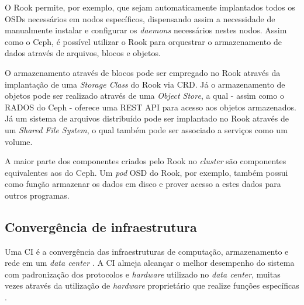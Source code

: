 O Rook permite, por exemplo, que sejam automaticamente implantados todos os \ac{OSD}s necessários em nodos específicos, dispensando assim a necessidade de manualmente instalar e configurar os \textit{daemons} necessários nestes nodos. Assim como o Ceph, é possível utilizar o Rook para orquestrar o armazenamento de dados através de arquivos, blocos e objetos.

O armazenamento através de blocos pode ser empregado no Rook através da implantação de uma \textit{Storage Class} do Rook via \ac{CRD}. Já o armazenamento de objetos pode ser realizado através de uma \textit{Object Store}, a qual - assim como o \ac{RADOS} do Ceph - oferece uma \ac{REST} \ac{API} para acesso aos objetos armazenados. Já um sistema de arquivos distribuído pode ser implantado no Rook através de um \textit{Shared File System}, o qual também pode ser associado a serviços como um volume.

A maior parte dos componentes criados pelo Rook no \textit{cluster} são componentes equivalentes aos do Ceph. Um \textit{pod} \ac{OSD} do Rook, por exemplo, também possui como função armazenar os dados em disco e prover acesso a estes dados para outros programas.


\subsection{Convergência de infraestrutura}

Uma \ac{CI} é a convergência das infraestruturas de computação, armazenamento e rede em um \textit{data center} \cite{netappconvergence}. A \ac{CI} almeja alcançar o melhor desempenho do sistema com padronização dos protocolos e \textit{hardware} utilizado no \textit{data center}, muitas vezes através da utilização de \textit{hardware} proprietário que realize funções específicas \cite{netappconvergence}.
 
